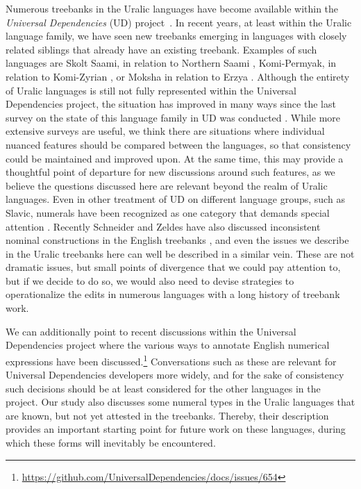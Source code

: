\documentclass[free]{flammie}
\begin{document}
Numerous treebanks in the Uralic languages have become available within the
\textit{Universal Dependencies} (UD) project~\cite{ud281}. In recent
years, at least within the Uralic language family, we have seen new treebanks
emerging in languages with closely related siblings that already have an
existing treebank. Examples of such languages are Skolt Saami, in relation to
Northern Saami \cite{tyers2017annotation}, Komi-Permyak, in relation to
Komi-Zyrian \cite{partanen2018first}, or Moksha in relation to Erzya
\cite{rueter2018towards}. Although the entirety of Uralic languages is still not
fully represented within the Universal Dependencies project, the situation has
improved in many ways since the last survey on the state of this language family
in UD was conducted \cite{partanen-rueter-2019-survey}. While more extensive
surveys are useful, we think there are situations where individual nuanced
features should be compared between the languages, so that consistency could be
maintained and improved upon. At the same time, this may provide a thoughtful
point of departure for new discussions around such features, as we believe the
questions discussed here are relevant beyond the realm of Uralic languages.
Even in other treatment of UD on different language groups, such as Slavic,
numerals have been recognized as one category that demands special attention
\cite{zeman2015slavic}. Recently Schneider and Zeldes have also discussed
inconsistent nominal constructions in the English treebanks
\cite{schneider2021mischievous}, and even the issues we describe in the
Uralic treebanks here can well be described in a similar vein. These are not
dramatic issues, but small points of divergence that we could pay attention to,
but if we decide to do so, we would also need to devise strategies to
operationalize the edits in numerous languages with a long history of treebank
work.

We can additionally point to recent discussions within the Universal
Dependencies project where the various ways to annotate English numerical
expressions have been
discussed.\footnote{\url{https://github.com/UniversalDependencies/docs/issues/654}}
Conversations such as these are relevant for Universal Dependencies developers
more widely, and for the sake of consistency such decisions should be at least
considered for the other languages in the project.  Our study also discusses
some numeral types in the Uralic languages that are known, but not yet attested
in the treebanks. Thereby, their description provides an important starting
point for future work on these languages, during which these forms will
inevitably be encountered.
\end{document}
